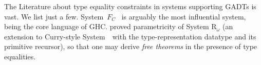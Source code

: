 The Literature about type equality constraints in systems supporting
GADTs is vast. We list just a few. System~$F_{\!C}$~\cite{Sulzmann07} is
arguably the most influential system, being the core language of GHC. 
\citet{VytWei10} proved parametricity of
System $\mathrm{R}_\omega$ \cite{Crary98} (an extension to Curry-style
System~\Fw\ with the type-representation datatype and its primitive recursor),
so that one may derive \emph{free theorems} \cite{Wadler89free}
in the presence of type equalities.



